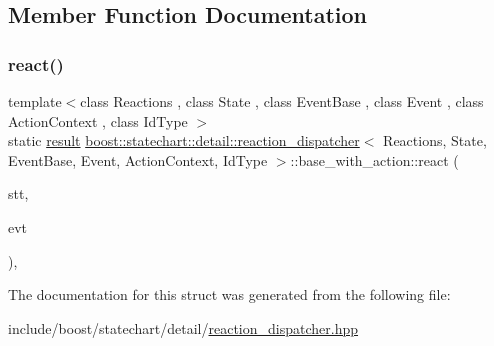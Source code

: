 \subsection{Member Function Documentation}
\mbox{\label{structboost_1_1statechart_1_1detail_1_1reaction__dispatcher_1_1base__with__action_a325fa0584944412ec6e24377c1b67dfc}} 
\subsubsection{\texorpdfstring{react()}{react()}}
{\footnotesize\ttfamily template$<$class Reactions , class State , class Event\+Base , class Event , class Action\+Context , class Id\+Type $>$ \\
static \mbox{\hyperlink{namespaceboost_1_1statechart_abe807f6598b614d6d87bb951ecd92331}{result}} \mbox{\hyperlink{classboost_1_1statechart_1_1detail_1_1reaction__dispatcher}{boost\+::statechart\+::detail\+::reaction\+\_\+dispatcher}}$<$ Reactions, State, Event\+Base, Event, Action\+Context, Id\+Type $>$\+::base\+\_\+with\+\_\+action\+::react (\begin{DoxyParamCaption}\item[{State \&}]{stt,  }\item[{const Event\+Base \&}]{evt }\end{DoxyParamCaption})\hspace{0.3cm}{\ttfamily [inline]}, {\ttfamily [static]}}



The documentation for this struct was generated from the following file\+:\begin{DoxyCompactItemize}
\item 
include/boost/statechart/detail/\mbox{\hyperlink{reaction__dispatcher_8hpp}{reaction\+\_\+dispatcher.\+hpp}}\end{DoxyCompactItemize}
